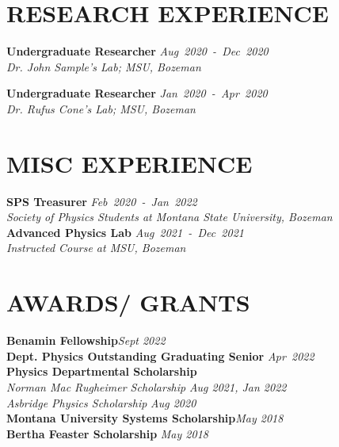 \documentclass[margin]{res}
\begin{document}
\begin{resume}

\section{RESEARCH EXPERIENCE}
\noindent
\raggedright
\textbf{Undergraduate Researcher}\hfill 
{\sl Aug~2020~-~Dec~2020}\\
{\sl Dr. John Sample's Lab; MSU, Bozeman}\vspace*{1ex}\\
\noindent
\raggedright
\textbf{Undergraduate Researcher}\hfill
{\sl Jan~2020~-~Apr~2020}\\
{\sl Dr. Rufus Cone's Lab; MSU, Bozeman}


\section{MISC EXPERIENCE}
\textbf{\textbf{SPS Treasurer}}\hfill
{\sl Feb~2020~-~Jan~2022}\\
{\sl Society of Physics Students at Montana State University, Bozeman}\vspace*{1ex}\\
\textbf{Advanced Physics Lab}\hfill
{\sl Aug~2021~-~Dec~2021}\\
{\sl Instructed Course at MSU, Bozeman}

\section{AWARDS/ GRANTS}
\textbf{Benamin Fellowship}\hfill {\sl Sept 2022}\vspace*{1ex}\\
\textbf{Dept. Physics Outstanding Graduating Senior} \hfill {\sl Apr~2022}\vspace*{1ex}\\
\textbf{Physics Departmental Scholarship}\vspace*{0.5ex}\\
\hspace{3ex} {\sl Norman Mac Rugheimer Scholarship} \hfill {\sl Aug 2021, Jan 2022}\vspace*{0.5ex}\\
\hspace{3ex} {\sl Asbridge Physics Scholarship} \hfill {\sl Aug 2020}\vspace*{1ex}\\
\textbf{Montana University Systems Scholarship}\hfill\hfil {\sl May 2018}\vspace*{1ex}\\
\textbf{Bertha Feaster Scholarship} \hfill {\sl May 2018}


\end{resume}
\end{document}
